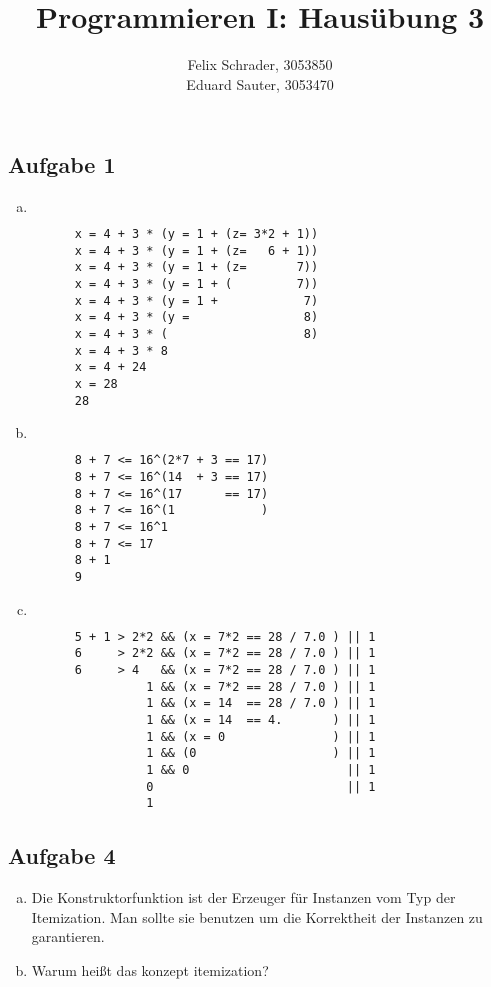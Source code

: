 \documentclass[11pt]{article}
\author{Felix Schrader, 3053850 \\
      Eduard Sauter, 3053470 }
\title{Programmieren I: Haus\"ubung 3}
\begin{document}
\maketitle
\subsection*{Aufgabe 1}
\begin{enumerate}[a)]
  \item $ $ %
    \begin{lstlisting}
      x = 4 + 3 * (y = 1 + (z= 3*2 + 1))
      x = 4 + 3 * (y = 1 + (z=   6 + 1))
      x = 4 + 3 * (y = 1 + (z=       7))
      x = 4 + 3 * (y = 1 + (         7))
      x = 4 + 3 * (y = 1 +            7)
      x = 4 + 3 * (y =                8)
      x = 4 + 3 * (                   8)
      x = 4 + 3 * 8
      x = 4 + 24                         
      x = 28                            
      28                            
    \end{lstlisting}
  \item $ $
    \begin{lstlisting}
      8 + 7 <= 16^(2*7 + 3 == 17)
      8 + 7 <= 16^(14  + 3 == 17)
      8 + 7 <= 16^(17      == 17)
      8 + 7 <= 16^(1            )
      8 + 7 <= 16^1              
      8 + 7 <= 17                
      8 + 1
      9
    \end{lstlisting}
  \item $ $
    \begin{lstlisting}
      5 + 1 > 2*2 && (x = 7*2 == 28 / 7.0 ) || 1
      6     > 2*2 && (x = 7*2 == 28 / 7.0 ) || 1
      6     > 4   && (x = 7*2 == 28 / 7.0 ) || 1
                1 && (x = 7*2 == 28 / 7.0 ) || 1
                1 && (x = 14  == 28 / 7.0 ) || 1
                1 && (x = 14  == 4.       ) || 1
                1 && (x = 0               ) || 1
                1 && (0                   ) || 1
                1 && 0                      || 1
                0                           || 1
                1
    \end{lstlisting}
  
  
\end{enumerate} 

\subsection*{Aufgabe 4}
\begin{enumerate}[a)]
  \item
    Die Konstruktorfunktion ist der Erzeuger f\"ur Instanzen vom Typ
    der Itemization. Man sollte sie benutzen um die Korrektheit der Instanzen
    zu garantieren.
  \item
    Warum hei\ss{}t das konzept itemization?
    
\end{enumerate}
\end{document}
